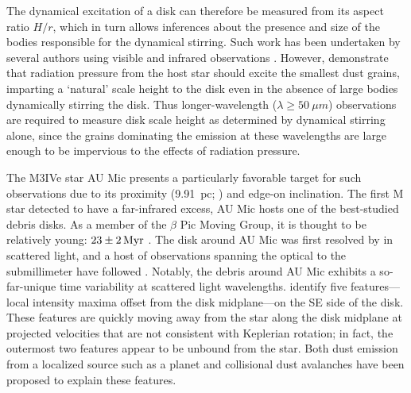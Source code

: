 \documentclass[12pt,oneside]{article}
\begin{document}
The dynamical excitation of a disk can therefore be measured from its aspect ratio $H/r$, which in turn allows inferences about the presence and size of the bodies responsible for the dynamical stirring.
Such work has been undertaken by several authors using visible and infrared observations \citep{artymowicz97,thebault&augereau07,quillen07}.
However, \cite{thebault09} demonstrate that radiation pressure from the host star should excite the smallest dust grains, imparting a `natural' scale height to the disk even in the absence of large bodies dynamically stirring the disk. 
Thus longer-wavelength ($\lambda \geq \SI{50}{\mu m}$) observations are required to measure disk scale height as determined by dynamical stirring alone, since the grains dominating the emission at these wavelengths are large enough to be impervious to the effects of radiation pressure.

The M3IVe star AU Mic presents a particularly favorable target for such observations due to its proximity (\SI{9.91}{pc}; \citealp{vanleeuwen07}) and edge-on inclination. 
The first M star detected to have a far-infrared excess, AU Mic hosts one of the best-studied debris disks. 
As a member of the $\beta$ Pic Moving Group, it is thought to be relatively young: $\SI{23 \pm 2}{Myr}$ \citep{binks&jeffries14,mamajek&bell14,malo14}. 
The disk around AU Mic was first resolved by \cite{kalas04} in scattered light, and a host of observations spanning the optical to the submillimeter have followed \citep{augereau&beust06,macgregor13,matthews15,schneider14,wang15}. 
Notably, the debris around AU Mic exhibits a so-far-unique time variability at scattered light wavelengths.
\cite{boccaletti15} identify five features---local intensity maxima offset from the disk midplane---on the SE side of the disk. 
These features are quickly moving away from the star along the disk midplane at projected velocities that are not consistent with Keplerian rotation; in fact, the outermost two features appear to be unbound from the star. 
Both dust emission from a localized source such as a planet \citep{boccaletti15,sezestre17} and collisional dust avalanches \citep{chiang&fung17} have been proposed to explain these features.
\end{document}
